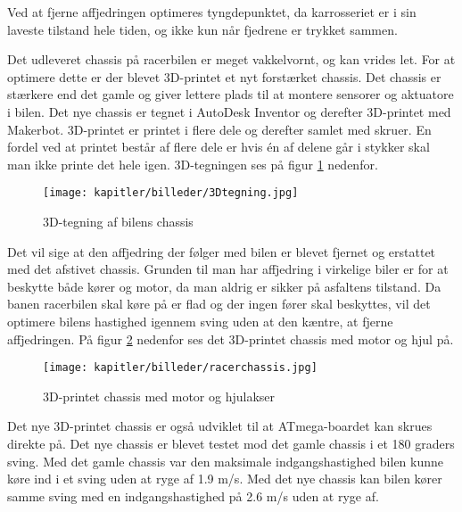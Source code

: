 Ved at fjerne affjedringen optimeres tyngdepunktet, da karrosseriet er i sin laveste tilstand hele tiden, og ikke kun når fjedrene er trykket sammen.

Det udleveret chassis på racerbilen er meget vakkelvornt, og kan vrides let.
For at optimere dette er der blevet 3D-printet et nyt forstærket chassis.
Det chassis er stærkere end det gamle og giver lettere plads til at montere sensorer og aktuatore i bilen.
Det nye chassis er tegnet i AutoDesk Inventor og derefter 3D-printet med Makerbot.
3D-printet er printet i flere dele og derefter samlet med skruer.
En fordel ved at printet består af flere dele er hvis én af delene går i stykker skal man ikke printe det hele igen.
3D-tegningen ses på figur \ref{fig:3Dtegning} nedenfor.

\begin{figure}[ht]
    \centering
    \texttt{[image: kapitler/billeder/3Dtegning.jpg]}
    \caption{3D-tegning af bilens chassis}
    \label{fig:3Dtegning}
\end{figure}


Det vil sige at den affjedring der følger med bilen er blevet fjernet og erstattet med det afstivet chassis. Grunden til man har affjedring i virkelige biler er for at beskytte både kører og motor, da man aldrig er sikker på asfaltens tilstand.
Da banen racerbilen skal køre på er flad og der ingen fører skal beskyttes, vil det optimere bilens hastighed igennem sving uden at den kæntre, at fjerne affjedringen. På figur \ref{fig:racerchassis} nedenfor ses det 3D-printet chassis med motor og hjul på.

\begin{figure}[ht]
    \centering
    \texttt{[image: kapitler/billeder/racerchassis.jpg]}
    \caption{3D-printet chassis med motor og hjulakser}
    \label{fig:racerchassis}
\end{figure}

Det nye 3D-printet chassis er også udviklet til at ATmega-boardet kan skrues direkte på. Det nye chassis er blevet testet mod det gamle chassis i et 180 graders sving. Med det gamle chassis var den maksimale indgangshastighed bilen kunne køre ind i et sving uden at ryge af 1.9 m/s. Med det nye chassis kan bilen kører samme sving med en indgangshastighed på 2.6 m/s uden at ryge af.

